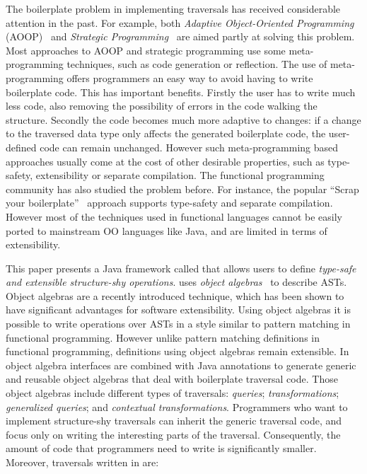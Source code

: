 The boilerplate problem in implementing traversals has received
considerable attention in the past. For example, both \emph{Adaptive
  Object-Oriented Programming} (AOOP)~\cite{DemeterBook} and
\emph{Strategic Programming}~\cite{borovansky1996elan,visser1998core}
are aimed partly at solving this problem. Most approaches to AOOP and
strategic programming use some meta-programming techniques, such as
code generation or reflection. The use of meta-programming offers
programmers an easy way to avoid having to write boilerplate code.
This has important benefits. Firstly the user has to write much less
code, also removing the possibility of errors in the code walking the
structure. Secondly the code becomes much more adaptive to changes: if
a change to the traversed data type only affects the generated
boilerplate code, the user-defined code can remain unchanged. However
such meta-programming based approaches usually come at the cost of
other desirable properties, such as type-safety, extensibility or
separate compilation. The functional programming community has also
studied the problem before. For instance, the popular ``Scrap your
boilerplate''~\cite{ralf03syb} approach supports type-safety and
separate compilation. However most of the techniques used in
functional languages cannot be easily ported to mainstream OO
languages like Java, and are limited in terms of extensibility.

This paper presents a Java framework called \name that allows users to
define \emph{type-safe and extensible structure-shy operations}. \name uses
\emph{object algebras}~\cite{bruno12oa} to describe ASTs. Object
algebras are a recently introduced technique, which has been shown to
have significant advantages for software extensibility. Using object 
algebras it is possible to write operations over ASTs in a 
style similar to pattern matching in functional programming. However 
unlike pattern matching definitions in functional programming, 
definitions using object algebras remain extensible. In \name
object algebra interfaces are combined with Java annotations to
generate generic and reusable object algebras that deal with
boilerplate traversal code. Those object algebras include different
types of traversals: \emph{queries}; \emph{transformations};
\emph{generalized queries}; and \emph{contextual transformations}. Programmers
who want to implement structure-shy traversals can inherit the
generic traversal code, and focus only on writing the interesting
parts of the traversal. Consequently, the amount of code that
programmers need to write is significantly smaller.
Moreover, traversals written in \name are:

